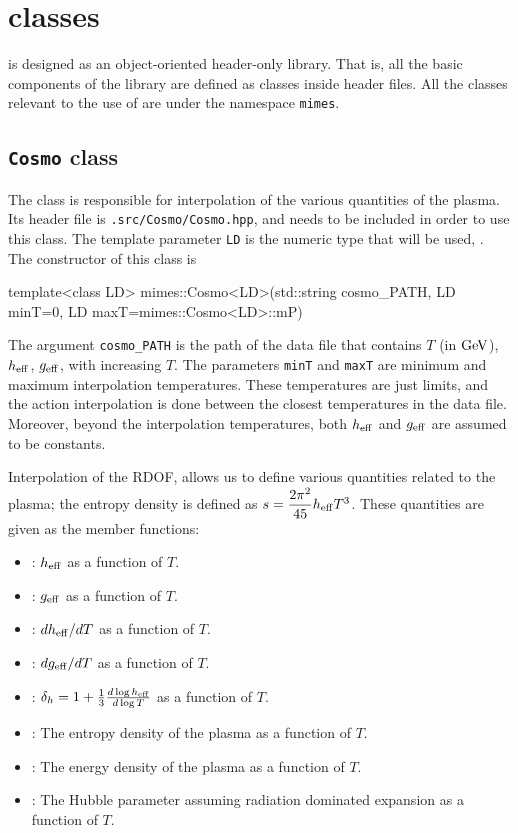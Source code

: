 \documentclass[11pt,a4paper]{article}
\begin{document}
\section{\CPP classes}\label{app:classes}
\setcounter{equation}{0}
%
\mimes is designed as an object-oriented header-only library. That is, all the basic components of the library are defined as classes inside header files. All the classes relevant to the use of \mimes are under the namespace {\tt mimes}.

\subsection{{\tt Cosmo} class}
%
The  class is responsible for interpolation of the various quantities of the plasma. Its header file is {\tt \mimes.src/Cosmo/Cosmo.hpp}, and needs to be included in order to use this class. The template parameter {\tt LD} is the numeric type that will be used, \eg {}. The constructor of this class is
%
\begin{cpp}
	template<class LD>
	mimes::Cosmo<LD>(std::string cosmo_PATH, LD minT=0, LD maxT=mimes::Cosmo<LD>::mP)
\end{cpp}
%
The argument {\tt cosmo\_PATH} is the path of the data file that contains $T$ (in ${\rm GeV}$), $h_{\rm eff}{}$, $g_{\rm eff}{}$, with increasing $T$. The parameters {\tt minT} and {\tt maxT} are minimum and maximum interpolation temperatures. These temperatures are just limits, and the action interpolation is done between the closest temperatures in the data file. Moreover, beyond the interpolation temperatures, both $h_{\rm eff}{}$ and $g_{\rm eff}{}$ are assumed to be constants.   

Interpolation of the RDOF, allows us to define various quantities related to the plasma; \eg the entropy density is defined as $s = \dfrac{2\pi^2}{45} h_{\rm eff}{} T^3$. These quantities are given as the member functions:
%
\begin{itemize}
	\item {}: $h_{\rm eff}{}$ as a function of $T$.
	\item {}: $g_{\rm eff}{}$ as a function of $T$.
	\item {}: $dh_{\rm eff}{}/dT$ as a function of $T$.
	\item {}: $dg_{\rm eff}{}/dT$ as a function of $T$.
	\item {}: $\delta_h = 1 + \frac{1}{3} \frac{d\log h_{\rm eff}{}}{d\log T}$ as a function of $T$.
	\item {}: The entropy density of the plasma as a function of $T$.
	\item {}: The energy density of the plasma as a function of $T$.
	\item {}: The Hubble parameter assuming radiation dominated expansion as a function of $T$.
\end{itemize}
\end{document}
